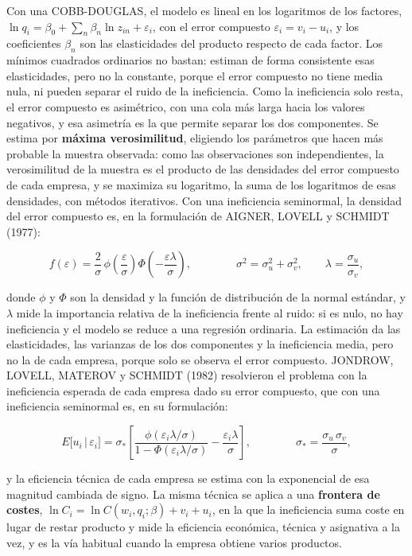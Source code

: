 \documentclass[10pt,a4paper]{article}
\begin{document}
Con una COBB-DOUGLAS, el modelo es lineal en los logaritmos de los factores, $\ln q_i=\beta_0+\sum_n\beta_n\ln z_{in}+\varepsilon_i$, con el error compuesto $\varepsilon_i=v_i-u_i$, y los coeficientes $\beta_n$ son las elasticidades del producto respecto de cada factor. Los mínimos cuadrados ordinarios no bastan: estiman de forma consistente esas elasticidades, pero no la constante, porque el error compuesto no tiene media nula, ni pueden separar el ruido de la ineficiencia. Como la ineficiencia solo resta, el error compuesto es asimétrico, con una cola más larga hacia los valores negativos, y esa asimetría es la que permite separar los dos componentes. Se estima por \textbf{máxima verosimilitud}, eligiendo los parámetros que hacen más probable la muestra observada: como las observaciones son independientes, la verosimilitud de la muestra es el producto de las densidades del error compuesto de cada empresa, y se maximiza su logaritmo, la suma de los logaritmos de esas densidades, con métodos iterativos. Con una ineficiencia seminormal, la densidad del error compuesto es, en la formulación de AIGNER, LOVELL y SCHMIDT (1977):

$$f(\varepsilon)=\frac{2}{\sigma}\,\phi\!\left(\frac{\varepsilon}{\sigma}\right)\Phi\!\left(-\frac{\varepsilon\lambda}{\sigma}\right),\qquad\qquad \sigma^2=\sigma_u^2+\sigma_v^2,\qquad \lambda=\frac{\sigma_u}{\sigma_v},$$

donde $\phi$ y $\Phi$ son la densidad y la función de distribución de la normal estándar, y $\lambda$ mide la importancia relativa de la ineficiencia frente al ruido: si es nulo, no hay ineficiencia y el modelo se reduce a una regresión ordinaria. La estimación da las elasticidades, las varianzas de los dos componentes y la ineficiencia media, pero no la de cada empresa, porque solo se observa el error compuesto. JONDROW, LOVELL, MATEROV y SCHMIDT (1982) resolvieron el problema con la ineficiencia esperada de cada empresa dado su error compuesto, que con una ineficiencia seminormal es, en su formulación:

$$E\big[u_i\,\big|\,\varepsilon_i\big]=\sigma_*\left[\frac{\phi(\varepsilon_i\lambda/\sigma)}{1-\Phi(\varepsilon_i\lambda/\sigma)}-\frac{\varepsilon_i\lambda}{\sigma}\right],\qquad\qquad \sigma_*=\frac{\sigma_u\,\sigma_v}{\sigma},$$

y la eficiencia técnica de cada empresa se estima con la exponencial de esa magnitud cambiada de signo. La misma técnica se aplica a una \textbf{frontera de costes}, $\ln C_i=\ln C(w_i,q_i;\beta)+v_i+u_i$, en la que la ineficiencia suma coste en lugar de restar producto y mide la eficiencia económica, técnica y asignativa a la vez, y es la vía habitual cuando la empresa obtiene varios productos.
\end{document}
